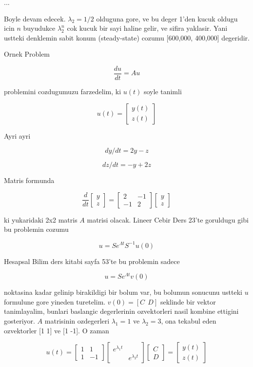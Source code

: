 \documentclass[12pt,fleqn]{article}
\begin{document}
...

Boyle devam edecek. $\lambda_2=1/2$ olduguna gore, ve bu deger 1'den kucuk
oldugu icin $n$ buyudukce $\lambda_2^n$ cok kucuk bir sayi haline gelir, ve
sifira yaklasir. Yani ustteki denklemin sabit konum (steady-state)
cozumu [600,000, 400,000] degeridir.

Ornek Problem

\[ 
\frac{du}{dt} = Au
 \]

problemini cozdugumuzu farzedelim, ki $u(t)$ soyle tanimli

\[ 
u(t) =
\left[\begin{array}{r}
y(t) \\
z(t)
\end{array}\right]
 \]

Ayri ayri

\[ dy/dt = 2y - z \]

\[ dz/dt = -y + 2z \]

Matris formunda

\[ 
\frac{d}{dt}
\left[\begin{array}{r}
y \\
z
\end{array}\right]=
\left[\begin{array}{rr}
2 & -1 \\
-1 & 2
\end{array}\right]
\left[\begin{array}{r}
y \\
z
\end{array}\right]
 \]

ki yukaridaki 2x2 matris $A$ matrisi olacak. Lineer Cebir Ders 23'te
goruldugu gibi bu problemin cozumu 

\[ u = S e^{\Lambda t} S^{-1} u(0) \]

Hesapsal Bilim ders kitabi sayfa 53'te bu problemin sadece 

\[ u = S e^{\Lambda t} v(0) \]

noktasina kadar gelinip birakildigi bir bolum var, bu bolumun sonucunu
ustteki $u$ formulune gore yineden turetelim. $v(0) = [C \ \ D]$ seklinde
bir vektor tanimlayalim, bunlari baslangic degerlerinin ozvektorleri nasil
kombine ettigini gosteriyor. $A$ matrisinin ozdegerleri $\lambda_1=1$ ve
$\lambda_2=3$, ona tekabul eden ozvektorler [1 1] ve [1 -1]. O zaman

\[ 
u(t) =
\left[\begin{array}{rr}
1 & 1 \\
1 & -1
\end{array}\right]
\left[\begin{array}{rr}
e^{\lambda_1 t} & \\
& e^{\lambda_2 t} 
\end{array}\right]
\left[\begin{array}{r}
C \\
D
\end{array}\right]
= 
\left[\begin{array}{r}
y(t) \\
z(t)
\end{array}\right]
 \]
\end{document}
